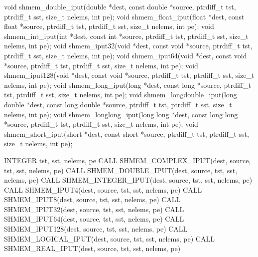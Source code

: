 \label{subsec:shmem_iput}
\synC
void shmem_double_iput(double *dest, const double *source, ptrdiff_t tst, ptrdiff_t sst, size_t nelems, int pe);
void shmem_float_iput(float *dest, const float *source, ptrdiff_t tst, ptrdiff_t sst, size_t nelems, int pe);
void shmem_int_iput(int *dest, const int *source, ptrdiff_t tst, ptrdiff_t sst, size_t nelems, int pe);
void shmem_iput32(void *dest, const void *source, ptrdiff_t tst, ptrdiff_t sst, size_t nelems, int pe);
void shmem_iput64(void *dest, const void *source, ptrdiff_t tst, ptrdiff_t sst, size_t nelems, int pe);
void shmem_iput128(void *dest, const void *source, ptrdiff_t tst, ptrdiff_t sst, size_t nelems, int pe);
void shmem_long_iput(long *dest, const long *source, ptrdiff_t tst, ptrdiff_t sst, size_t nelems, int pe);
void shmem_longdouble_iput(long double *dest, const long double *source, ptrdiff_t tst, ptrdiff_t sst, size_t nelems, int pe);
void shmem_longlong_iput(long long *dest, const long long *source, ptrdiff_t tst, ptrdiff_t sst, size_t nelems, int pe);
void shmem_short_iput(short *dest, const short *source, ptrdiff_t tst, ptrdiff_t sst, size_t nelems, int pe); %
\synF   %

INTEGER tst, sst, nelems, pe
CALL SHMEM_COMPLEX_IPUT(dest, source, tst, sst, nelems, pe)
CALL SHMEM_DOUBLE_IPUT(dest, source, tst, sst, nelems, pe)
CALL SHMEM_INTEGER_IPUT(dest, source, tst, sst, nelems, pe)
CALL SHMEM_IPUT4(dest, source, tst, sst, nelems, pe)
CALL SHMEM_IPUT8(dest, source, tst, sst, nelems, pe)
CALL SHMEM_IPUT32(dest, source, tst, sst, nelems, pe)
CALL SHMEM_IPUT64(dest, source, tst, sst, nelems, pe)
CALL SHMEM_IPUT128(dest, source, tst, sst, nelems, pe)
CALL SHMEM_LOGICAL_IPUT(dest, source, tst, sst, nelems, pe)
CALL SHMEM_REAL_IPUT(dest, source, tst, sst, nelems, pe) %

